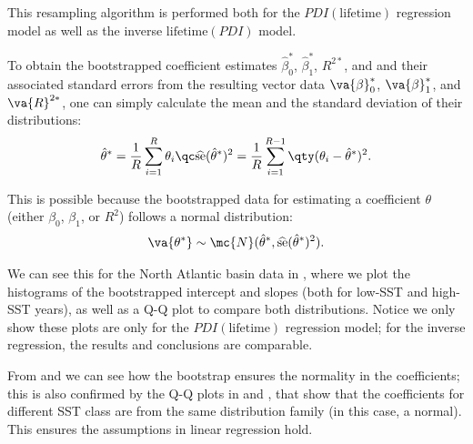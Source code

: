 This resampling algorithm is performed both for the $PDI(\text{lifetime})$ regression model as well as the inverse $\text{lifetime}(PDI)$ model.

\bigskip
To obtain the bootstrapped coefficient estimates $\hat{\beta}_{0}^{\ast}$, $\hat{\beta}_{1}^{\ast}$, $R^{2\ast}$, and and their associated standard errors from the resulting vector data $\va{\beta}_{0}^{\ast}$, $\va{\beta}_{1}^{\ast}$, and $\va{R}^{2\ast}$, one can simply calculate the mean and the standard deviation of their distributions:
\begin{align}
	\hat{\theta}^{\ast} = \frac{1}{R} \sum_{i=1}^{R} \theta_{i}
	\qc
	\se{\hat{\theta}^{\ast}}^{2} = \frac{1}{R} \sum_{i=1}^{R-1} \qty(\theta_{i} - \hat{\theta}^{\ast})^{2}
	.
\end{align}

This is possible because the bootstrapped data for estimating a coefficient $\theta$ (either $\beta_{0}$, $\beta_{1}$, or $R^{2}$) follows a normal distribution:
\begin{align}
	\va{\theta^{\ast}} \sim \mc{N}(\hat{\theta}^{\ast}, \se{\hat{\theta}^{\ast}}^{2} )
	.
\end{align}

We can see this for the North Atlantic basin data in , where we plot the histograms of the bootstrapped intercept and slopes (both for low-SST and high-SST years), as well as a Q-Q plot to compare both distributions. Notice we only show these plots are only for the $PDI(\text{lifetime})$ regression model; for the inverse regression, the results and conclusions are comparable.

From  and  we can see how the bootstrap ensures the normality in the coefficients; this is also confirmed by the Q-Q plots in  and , that show that the coefficients for different SST class are from the same distribution family (in this case, a normal). This ensures the assumptions in linear regression hold.

